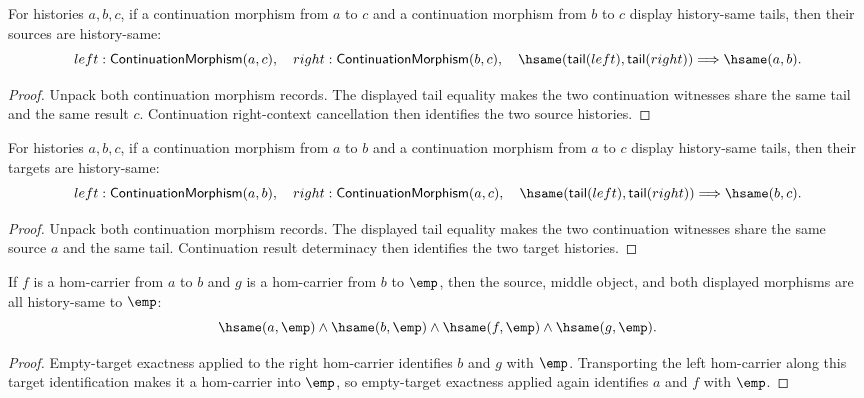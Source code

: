 \begin{theorem}
\label{thm:continuation-morphism-source-deterministic}
For histories $a,b,c$, if a continuation morphism from $a$ to $c$ and a
continuation morphism from $b$ to $c$ display history-same tails, then their
sources are history-same:
$$
left:\mathsf{ContinuationMorphism}(a,c),\quad
right:\mathsf{ContinuationMorphism}(b,c),\quad
\hsame(\mathsf{tail}(left),\mathsf{tail}(right))
\Longrightarrow
\hsame(a,b).
$$
\end{theorem}
\begin{proof}
Unpack both continuation morphism records. The displayed tail equality makes
the two continuation witnesses share the same tail and the same result $c$.
Continuation right-context cancellation then identifies the two source
histories.
\end{proof}

\begin{theorem}
\label{thm:continuation-morphism-target-deterministic}
For histories $a,b,c$, if a continuation morphism from $a$ to $b$ and a
continuation morphism from $a$ to $c$ display history-same tails, then their
targets are history-same:
$$
left:\mathsf{ContinuationMorphism}(a,b),\quad
right:\mathsf{ContinuationMorphism}(a,c),\quad
\hsame(\mathsf{tail}(left),\mathsf{tail}(right))
\Longrightarrow
\hsame(b,c).
$$
\end{theorem}
\begin{proof}
Unpack both continuation morphism records. The displayed tail equality makes
the two continuation witnesses share the same source $a$ and the same tail.
Continuation result determinacy then identifies the two target histories.
\end{proof}

\begin{theorem}
\label{thm:category-hom-carrier-empty-target-chain-inversion}
If $f$ is a hom-carrier from $a$ to $b$ and $g$ is a hom-carrier from $b$ to
$\emp$, then the source, middle object, and both displayed morphisms are all
history-same to $\emp$:
$$
\hsame(a,\emp)\land\hsame(b,\emp)\land\hsame(f,\emp)\land\hsame(g,\emp).
$$
\end{theorem}
\begin{proof}
Empty-target exactness applied to the right hom-carrier identifies $b$ and
$g$ with $\emp$. Transporting the left hom-carrier along this target
identification makes it a hom-carrier into $\emp$, so empty-target exactness
applied again identifies $a$ and $f$ with $\emp$.
\end{proof}

